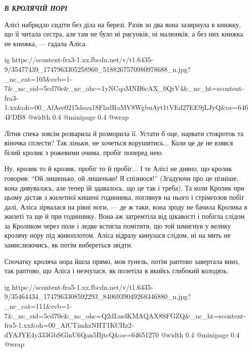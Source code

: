  
 
 
 
 


\begin{center}
\Large\bfseries\emph{В КРОЛЯЧІЙ НОРІ}
\end{center}

Алісі набридло сидіти без діла на березі. Разів зо два вона зазирнула в книжку,
що її читала сестра, але там не було ні рисунків, ні малюнків, а без них книжка
не книжка, — гадала Аліса.

\ifcmt
  ig https://scontent-fra3-1.xx.fbcdn.net/v/t1.6435-9/35477439_1747963305258960_5188267570980978688_n.jpg?_nc_cat=105&ccb=1-7&_nc_sid=5cd70e&_nc_ohc=1yNCqoMNB6cAX_0QrV4&_nc_ht=scontent-fra3-1.xx&oh=00_AfAee0215dsau18FlzdRaMV8WgbuAyt1tVEd27EE9jLJyQ&oe=6464FDB8
  @width 0.4
  @minipage 0.4
  @wrap \parpic[r]
\fi

Літня спека зовсім розварила й розморила її. Устати б оце, нарвати стокроток та
віночка сплести? Так ліньки, не хочеться ворушитись... Коли це де не взявся
білий кролик з рожевими очима, пробіг поперед нею.

Ну, кролик то й кролик, пробіг то й пробіг... І те Алісі не дивно, що кролик
говорив: \enquote{Ой лишенько, ой лишенько! Я спізнюся!} (Згадуючи про це пізніше, вона
дивувалась, але тепер їй здавалось, що це так і треба). Та коли Кролик при
цьому дістав з жилетної кишені годинника, поглянув на нього і стрімголов побіг
далі, Аліса зірвалася на рівні ноги, — де ж таки, вона зроду не бачила Кролика
в жилеті та ще й при годиннику. Вона аж затремтіла від цікавості і побігла
слідом за Кроликом через поле і ледве встигла помітити, що той шмигнув у велику
кролячу нору під живоплотом. Аліса відразу кинулася слідом, ні на мить не
замислюючись, як потім вибереться звідти.

Спочатку кроляча нора йшла прямо, мов тунель, потім раптово завертала вниз, так
раптово, що Аліса і незчулася, як полетіла в якийсь глибокий колодязь.

\ifcmt
  ig https://scontent-fra5-1.xx.fbcdn.net/v/t1.6435-9/35464434_1747963308592293_8406939049268346880_n.jpg?_nc_cat=111&ccb=1-7&_nc_sid=5cd70e&_nc_ohc=Q2dLuelKMAQAX8SFGZQ&_nc_ht=scontent-fra5-1.xx&oh=00_AfCTimkzNHT1KCHz2-dYAJYE4y333GbSGlnU6Qan5BjtcQ&oe=64651270
  @width 0.4
  @minipage 0.4
  @wrap \parpic[l]
\fi


